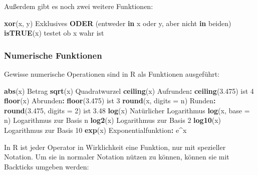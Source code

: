 \documentclass[
]{article}
\newenvironment{Shaded}{\begin{snugshade}}{\end{snugshade}}
\newcommand{\AttributeTok}[1]{\textcolor[rgb]{0.13,0.29,0.53}{#1}}
\newcommand{\ControlFlowTok}[1]{\textcolor[rgb]{0.13,0.29,0.53}{\textbf{#1}}}
\newcommand{\DecValTok}[1]{\textcolor[rgb]{0.00,0.00,0.81}{#1}}
\newcommand{\FloatTok}[1]{\textcolor[rgb]{0.00,0.00,0.81}{#1}}
\newcommand{\FunctionTok}[1]{\textcolor[rgb]{0.13,0.29,0.53}{\textbf{#1}}}
\newcommand{\NormalTok}[1]{#1}
\newcommand{\SpecialCharTok}[1]{\textcolor[rgb]{0.81,0.36,0.00}{\textbf{#1}}}
\begin{document}
Außerdem gibt es noch zwei weitere Funktionen:

\begin{Shaded}
\begin{Highlighting}[]
\FunctionTok{xor}\NormalTok{(x, y)       Exklusives }\FunctionTok{ODER}\NormalTok{ (entweder }\ControlFlowTok{in}\NormalTok{ x oder y, aber nicht }\ControlFlowTok{in}\NormalTok{ beiden)}
\FunctionTok{isTRUE}\NormalTok{(x)       testet ob x wahr ist}
\end{Highlighting}
\end{Shaded}

\hypertarget{numerische-funktionen}{%
\subsubsection{Numerische Funktionen}\label{numerische-funktionen}}

Gewisse numerische Operationen sind in R als Funktionen ausgeführt:

\begin{Shaded}
\begin{Highlighting}[]
\FunctionTok{abs}\NormalTok{(x)                Betrag}
\FunctionTok{sqrt}\NormalTok{(x)               Quadratwurzel}
\FunctionTok{ceiling}\NormalTok{(x)            Aufrunden}\SpecialCharTok{:} \FunctionTok{ceiling}\NormalTok{(}\FloatTok{3.475}\NormalTok{) ist }\DecValTok{4}
\FunctionTok{floor}\NormalTok{(x)              Abrunden}\SpecialCharTok{:} \FunctionTok{floor}\NormalTok{(}\FloatTok{3.475}\NormalTok{) ist }\DecValTok{3}
\FunctionTok{round}\NormalTok{(x, }\AttributeTok{digits =}\NormalTok{ n)  Runden}\SpecialCharTok{:} \FunctionTok{round}\NormalTok{(}\FloatTok{3.475}\NormalTok{, }\AttributeTok{digits =} \DecValTok{2}\NormalTok{) ist }\FloatTok{3.48}
\FunctionTok{log}\NormalTok{(x)                Natürlicher Logarithmus}
\FunctionTok{log}\NormalTok{(x, }\AttributeTok{base =}\NormalTok{ n)      Logarithmus zur Basis n}
\FunctionTok{log2}\NormalTok{(x)               Logarithmus zur Basis }\DecValTok{2}
\FunctionTok{log10}\NormalTok{(x)              Logarithmus zur Basis }\DecValTok{10}
\FunctionTok{exp}\NormalTok{(x)                Exponentialfunktion}\SpecialCharTok{:}\NormalTok{ e}\SpecialCharTok{\^{}}\NormalTok{x}
\end{Highlighting}
\end{Shaded}

In R ist jeder Operator in Wirklichkeit eine Funktion, nur mit
spezieller Notation. Um sie in normaler Notation nützen zu können,
können sie mit Backticks umgeben werden:
\end{document}
